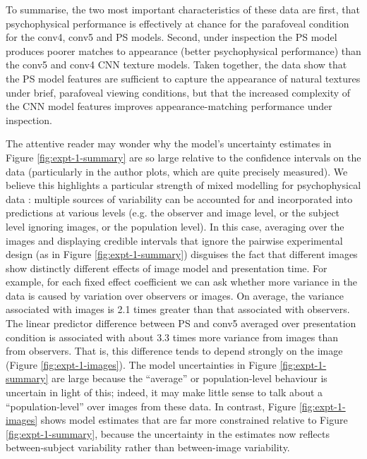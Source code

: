 \documentclass[article, 11pt,a4paper,natbib]{apa6}\usepackage[]{graphicx}\usepackage[]{color}
\begin{document}
To summarise, the two most important characteristics of these data are first, that psychophysical performance is effectively at chance for the parafoveal condition for the conv4, conv5 and PS models.
Second, under inspection the PS model produces poorer matches to appearance (better psychophysical performance) than the conv5 and conv4 CNN texture models.
Taken together, the data show that the PS model features are sufficient to capture the appearance of natural textures under brief, parafoveal viewing conditions, but that the increased complexity of the CNN model features improves appearance-matching performance under inspection.



The attentive reader may wonder why the model's uncertainty estimates in Figure \ref{fig:expt-1-summary} are so large relative to the confidence intervals on the data (particularly in the author plots, which are quite precisely measured).
We believe this highlights a particular strength of mixed modelling for psychophysical data \citep{cheung_nonlinear_2008,knoblauch_modeling_2012,moscatelli_modeling_2012}: multiple sources of variability can be accounted for and incorporated into predictions at various levels (e.g. the observer and image level, or the subject level ignoring images, or the population level).
In this case, averaging over the images and displaying credible intervals that ignore the pairwise experimental design (as in Figure \ref{fig:expt-1-summary}) disguises the fact that different images show distinctly different effects of image model and presentation time.
For example, for each fixed effect coefficient we can ask whether more variance in the data is caused by variation over observers or images.
On average, the variance associated with images is 2.1 times greater than that associated with observers.
The linear predictor difference between PS and conv5 averaged over presentation condition is associated with about 3.3 times more variance from images than from observers.
That is, this difference tends to depend strongly on the image (Figure \ref{fig:expt-1-images}).
The model uncertainties in Figure \ref{fig:expt-1-summary} are large because the ``average'' or population-level behaviour is uncertain in light of this; indeed, it may make little sense to talk about a ``population-level'' over images from these data.
In contrast, Figure \ref{fig:expt-1-images} shows model estimates that are far more constrained relative to Figure \ref{fig:expt-1-summary}, because the uncertainty in the estimates now reflects between-subject variability rather than between-image variability.
\end{document}
